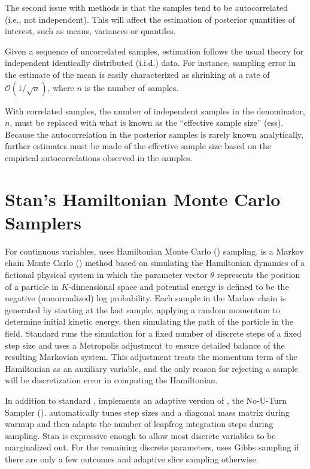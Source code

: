 The second issue with \MCMC methods is that the samples tend to be
autocorrelated (i.e., not independent).  This will affect the
estimation of posterior quantities of interest, such as means,
variances or quantiles.

Given a sequence of uncorrelated samples, estimation follows the usual
theory for independent identically distributed (i.i.d.) data.  For
instance, sampling error in the estimate of the mean is easily
characterized as shrinking at a rate of ${\mathcal O}(1/\sqrt{n})$,
where $n$ is the number of samples.

With correlated samples, the number of independent samples in the
denominator, $n$, must be replaced with what is known as the
``effective sample size'' ({\sc ess}).  Because the autocorrelation in
the posterior samples is rarely known analytically, further estimates
must be made of the effective sample size based on the empirical
autocorrelations observed in the samples.  


\section{Stan's Hamiltonian Monte Carlo Samplers}\label{intro-samplers.section}

For continuous variables, \Stan uses Hamiltonian Monte Carlo (\HMC)
sampling. \HMC is a Markov chain Monte Carlo (\MCMC) method based on
simulating the Hamiltonian dynamics of a fictional physical system in
which the parameter vector $\theta$ represents the position of a
particle in $K$-dimensional space and potential energy is defined to
be the negative (unnormalized) log probability.  Each sample in the
Markov chain is generated by starting at the last sample, applying a
random momentum to determine initial kinetic energy, then simulating
the path of the particle in the field.  Standard \HMC runs the
simulation for a fixed number of discrete steps of a fixed step size
and uses a Metropolis adjustment to ensure detailed balance of the
resulting Markovian system.  This adjustment treats the momentum term
of the Hamiltonian as an auxiliary variable, and the only reason for
rejecting a sample will be discretization error in computing the
Hamiltonian.

In addition to standard \HMC, \Stan implements an adaptive
version of \HMC, the No-U-Turn Sampler (\NUTS).  \NUTS automatically
tunes step sizes and a diagonal mass matrix during warmup and then
adapts the number of leapfrog integration steps during sampling.
Stan is expressive enough to allow most discrete variables to be
marginalized out.  For the remaining discrete parameters, \Stan uses
Gibbs sampling if there are only a few outcomes and adaptive slice
sampling otherwise.


